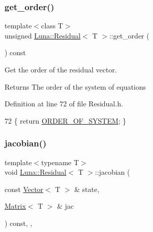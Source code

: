 \subsubsection{\texorpdfstring{get\+\_\+order()}{get\_order()}}
{\footnotesize\ttfamily template$<$class T$>$ \\
unsigned \hyperlink{classLuna_1_1Residual}{Luna\+::\+Residual}$<$ T $>$\+::get\+\_\+order (\begin{DoxyParamCaption}{ }\end{DoxyParamCaption}) const\hspace{0.3cm}{\ttfamily [inline]}}



Get the order of the residual vector. 

\begin{DoxyReturn}{Returns}
The order of the system of equations 
\end{DoxyReturn}


Definition at line 72 of file Residual.\+h.


\begin{DoxyCode}
72 \{ \textcolor{keywordflow}{return} \hyperlink{classLuna_1_1Residual_a7facf1267eb277d84aeea8beba2cb200}{ORDER\_OF\_SYSTEM}; \}
\end{DoxyCode}
\mbox{\label{classLuna_1_1Residual_acfcbc7bc2731b0c432de7f98b9b7cca5}} 
\subsubsection{\texorpdfstring{jacobian()}{jacobian()}\hspace{0.1cm}{\footnotesize\ttfamily [1/2]}}
{\footnotesize\ttfamily template$<$typename T$>$ \\
void \hyperlink{classLuna_1_1Residual}{Luna\+::\+Residual}$<$ T $>$\+::jacobian (\begin{DoxyParamCaption}\item[{const \hyperlink{classLuna_1_1Vector}{Vector}$<$ T $>$ \&}]{state,  }\item[{\hyperlink{classLuna_1_1Matrix}{Matrix}$<$ T $>$ \&}]{jac }\end{DoxyParamCaption}) const\hspace{0.3cm}{\ttfamily [inline]}, {\ttfamily [protected]}, {\ttfamily [virtual]}}



